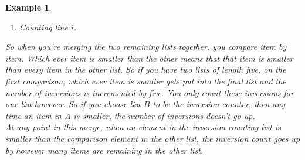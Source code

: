 \documentclass{report}
\newtheorem*{ex}{Example}
\begin{document}
\begin{ex}
\begin{enumerate}
\item Counting line $i$.
\end{enumerate}
So when you're merging the two remaining lists together, you compare item by item. Which ever item is smaller than the other means that that item is smaller than every item in the other list. So if you have two lists of length five, on the first comparison, which ever item is smaller gets put into the final list and the number of inversions is incremented by five. You only count these inversions for one list however. So if you choose list $B$ to be the inversion counter, then any time an item in $A$ is smaller, the number of inversions doesn't go up.\\
At any point in this merge, when an element in the inversion counting list is smaller than the comparison element in the other list, the inversion count goes up by however many items are remaining in the other list.\\ 
\end{ex}
\end{document}
